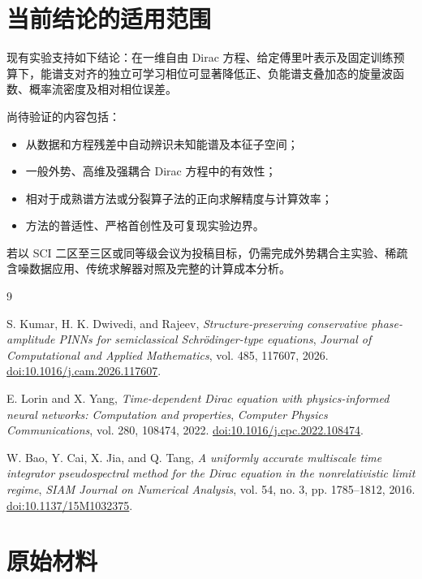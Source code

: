 \documentclass[UTF8,a4paper,12pt,fontset=fandol]{ctexart}
\begin{document}
\section{当前结论的适用范围}

现有实验支持如下结论：在一维自由 Dirac 方程、给定傅里叶表示及固定训练预算下，能谱支对齐的独立可学习相位可显著降低正、负能谱支叠加态的旋量波函数、概率流密度及相对相位误差。

尚待验证的内容包括：
\begin{itemize}
  \item 从数据和方程残差中自动辨识未知能谱及本征子空间；
  \item 一般外势、高维及强耦合 Dirac 方程中的有效性；
  \item 相对于成熟谱方法或分裂算子法的正向求解精度与计算效率；
  \item 方法的普适性、严格首创性及可复现实验边界。
\end{itemize}

若以 SCI 二区至三区或同等级会议为投稿目标，仍需完成外势耦合主实验、稀疏含噪数据应用、传统求解器对照及完整的计算成本分析。

\enlargethispage{4\baselineskip}
\begin{thebibliography}{9}
\raggedright
\footnotesize

S. Kumar, H. K. Dwivedi, and Rajeev,
\emph{Structure-preserving conservative phase-amplitude PINNs for semiclassical Schrödinger-type equations},
\textit{Journal of Computational and Applied Mathematics}, vol. 485, 117607, 2026.
\href{https://doi.org/10.1016/j.cam.2026.117607}{doi:10.1016/j.cam.2026.117607}.

E. Lorin and X. Yang,
\emph{Time-dependent Dirac equation with physics-informed neural networks: Computation and properties},
\textit{Computer Physics Communications}, vol. 280, 108474, 2022.
\href{https://doi.org/10.1016/j.cpc.2022.108474}{doi:10.1016/j.cpc.2022.108474}.

W. Bao, Y. Cai, X. Jia, and Q. Tang,
\emph{A uniformly accurate multiscale time integrator pseudospectral method for the Dirac equation in the nonrelativistic limit regime},
\textit{SIAM Journal on Numerical Analysis}, vol. 54, no. 3, pp. 1785--1812, 2016.
\href{https://doi.org/10.1137/15M1032375}{doi:10.1137/15M1032375}.

\end{thebibliography}

\section{原始材料}
\end{document}
